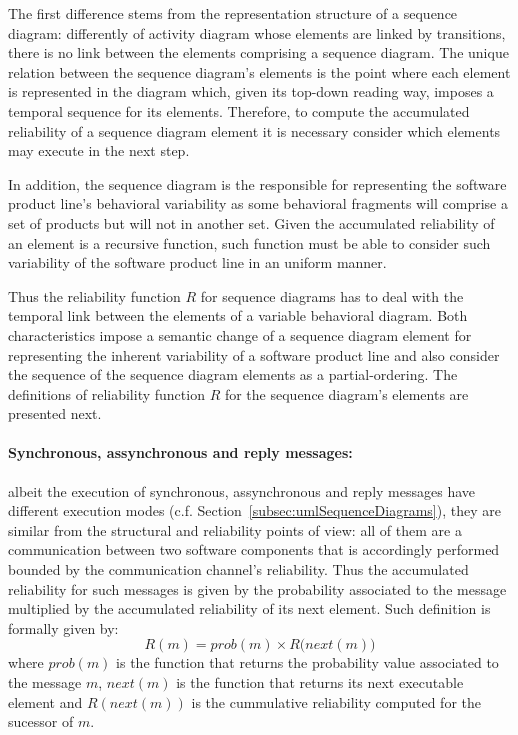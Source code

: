 The first difference stems from the representation structure of a sequence diagram: 
differently of activity diagram whose elements are linked by transitions, there is no link between the elements
comprising a sequence diagram. The unique relation
between the sequence diagram's elements is the point where each element is
represented in the diagram which, given its top-down reading way, imposes a
temporal sequence for its elements. Therefore, to compute the accumulated reliability
of a sequence diagram element it is necessary consider which elements may
execute in the next step.

In addition, the sequence diagram is the responsible for representing the
software product line's behavioral variability as some behavioral
fragments will comprise a set of products but will not in another set. Given the
accumulated reliability of an element is a recursive function,
such function must be able to consider such variability of the
software product line in an uniform manner.

Thus the reliability function $R$ for sequence diagrams has to deal
with the temporal link between the elements of a variable behavioral diagram.
Both characteristics impose a semantic change of a sequence diagram element for
representing the inherent variability of a software product line and also
consider the sequence of the sequence diagram elements as a partial-ordering.
The definitions of reliability function $R$ for the sequence diagram's elements are presented next. 



\paragraph{Synchronous, assynchronous and reply messages:
	\label{subsec:relMessages}}
albeit the execution of synchronous, assynchronous and reply messages have
different execution modes (c.f. Section~\ref{subsec:umlSequenceDiagrams}), they are similar from the structural and
reliability points of view: all of them are a communication
between two software components that is accordingly performed  bounded by the
communication channel's reliability. Thus  the
accumulated reliability for such messages is given by the probability associated
to the message multiplied by the accumulated reliability of its next
element. Such definition is formally given by: \begin{equation}
	\label{eq:syncMessageReliability} R(m) = prob(m) \times R\big(next(m)\big)
\end{equation} where $prob(m)$ is the function
that returns the probability value associated to the message $m$, $next(m)$ is the function that returns its next executable element
and $R(next(m))$ is the cummulative reliability computed for the
sucessor of $m$.

